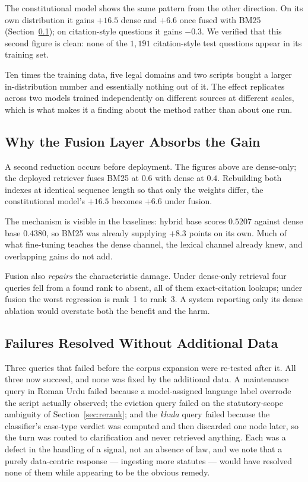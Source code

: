 \documentclass[conference]{IEEEtran}
\begin{document}
The constitutional model shows the same pattern from the other direction. On
its own distribution it gains $+16.5$ dense and $+6.6$ once fused with BM25
(Section~\ref{sec:hybrid}); on citation-style questions it gains
\textbf{$-0.3$}. We verified that this second figure is clean: none of the
$1{,}191$ citation-style test questions appear in its training set.

Ten times the training data, five legal domains and two scripts bought a larger
in-distribution number and essentially nothing out of it. The effect replicates
across two models trained independently on different sources at different
scales, which is what makes it a finding about the method rather than about one
run.

\subsection{Why the Fusion Layer Absorbs the Gain}
\label{sec:hybrid}
A second reduction occurs before deployment. The figures above are dense-only;
the deployed retriever fuses BM25 at $0.6$ with dense at $0.4$. Rebuilding both
indexes at identical sequence length so that only the weights differ, the
constitutional model's $+16.5$ becomes $\mathbf{+6.6}$ under fusion.

The mechanism is visible in the baselines: hybrid base scores $0.5207$ against
dense base $0.4380$, so BM25 was already supplying $+8.3$ points on its own.
Much of what fine-tuning teaches the dense channel, the lexical channel already
knew, and overlapping gains do not add.

Fusion also \emph{repairs} the characteristic damage. Under dense-only retrieval
four queries fell from a found rank to absent, all of them exact-citation
lookups; under fusion the worst regression is rank~1 to rank~3. A system
reporting only its dense ablation would overstate both the benefit and the harm.

\subsection{Failures Resolved Without Additional Data}
Three queries that failed before the corpus expansion were re-tested after it.
All three now succeed, and none was fixed by the additional data. A maintenance
query in Roman Urdu failed because a model-assigned language label overrode the
script actually observed; the eviction query failed on the statutory-scope
ambiguity of Section~\ref{sec:rerank}; and the \emph{khula} query failed because
the classifier's case-type verdict was computed and then discarded one node
later, so the turn was routed to clarification and never retrieved anything.
Each was a defect in the handling of a signal, not an absence of law, and we
note that a purely data-centric response --- ingesting more statutes --- would
have resolved none of them while appearing to be the obvious remedy.
\end{document}
